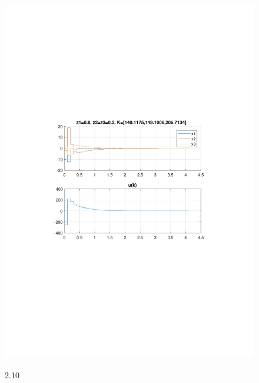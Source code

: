 \documentclass{article}
\begin{document}
{\begin{figure}[H]
\includegraphics[clip, trim=0.5cm 9.5cm 0.5cm 9.5cm, width=1.00\textwidth]{../rys/zad3b_rys10.pdf}
\label{fig:rys3.2.10}
\caption{2.10}
\end{figure}
}
\end{document}

